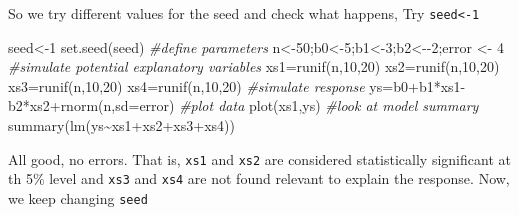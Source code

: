 \documentclass[
]{book}
\newenvironment{Shaded}{\begin{snugshade}}{\end{snugshade}}
\newcommand{\AttributeTok}[1]{\textcolor[rgb]{0.77,0.63,0.00}{#1}}
\newcommand{\CommentTok}[1]{\textcolor[rgb]{0.56,0.35,0.01}{\textit{#1}}}
\newcommand{\DecValTok}[1]{\textcolor[rgb]{0.00,0.00,0.81}{#1}}
\newcommand{\FunctionTok}[1]{\textcolor[rgb]{0.00,0.00,0.00}{#1}}
\newcommand{\NormalTok}[1]{#1}
\newcommand{\OtherTok}[1]{\textcolor[rgb]{0.56,0.35,0.01}{#1}}
\newcommand{\SpecialCharTok}[1]{\textcolor[rgb]{0.00,0.00,0.00}{#1}}
\begin{document}
So we try different values for the seed and check what happens, Try \texttt{seed\textless{}-1}

\begin{Shaded}
\begin{Highlighting}[]
\NormalTok{seed}\OtherTok{\textless{}{-}}\DecValTok{1}
\FunctionTok{set.seed}\NormalTok{(seed)}
\CommentTok{\#define parameters}
\NormalTok{n}\OtherTok{\textless{}{-}}\DecValTok{50}\NormalTok{;b0}\OtherTok{\textless{}{-}}\DecValTok{5}\NormalTok{;b1}\OtherTok{\textless{}{-}}\DecValTok{3}\NormalTok{;b2}\OtherTok{\textless{}{-}}\SpecialCharTok{{-}}\DecValTok{2}\NormalTok{;error }\OtherTok{\textless{}{-}} \DecValTok{4}
\CommentTok{\#simulate potential explanatory variables}
\NormalTok{xs1}\OtherTok{=}\FunctionTok{runif}\NormalTok{(n,}\DecValTok{10}\NormalTok{,}\DecValTok{20}\NormalTok{)}
\NormalTok{xs2}\OtherTok{=}\FunctionTok{runif}\NormalTok{(n,}\DecValTok{10}\NormalTok{,}\DecValTok{20}\NormalTok{)}
\NormalTok{xs3}\OtherTok{=}\FunctionTok{runif}\NormalTok{(n,}\DecValTok{10}\NormalTok{,}\DecValTok{20}\NormalTok{)}
\NormalTok{xs4}\OtherTok{=}\FunctionTok{runif}\NormalTok{(n,}\DecValTok{10}\NormalTok{,}\DecValTok{20}\NormalTok{)}
\CommentTok{\#simulate response}
\NormalTok{ys}\OtherTok{=}\NormalTok{b0}\SpecialCharTok{+}\NormalTok{b1}\SpecialCharTok{*}\NormalTok{xs1}\SpecialCharTok{{-}}\NormalTok{b2}\SpecialCharTok{*}\NormalTok{xs2}\SpecialCharTok{+}\FunctionTok{rnorm}\NormalTok{(n,}\AttributeTok{sd=}\NormalTok{error)}
\CommentTok{\#plot data}
\FunctionTok{plot}\NormalTok{(xs1,ys)}
\CommentTok{\#look at model summary}
\FunctionTok{summary}\NormalTok{(}\FunctionTok{lm}\NormalTok{(ys}\SpecialCharTok{\textasciitilde{}}\NormalTok{xs1}\SpecialCharTok{+}\NormalTok{xs2}\SpecialCharTok{+}\NormalTok{xs3}\SpecialCharTok{+}\NormalTok{xs4))}
\end{Highlighting}
\end{Shaded}

All good, no errors. That is, \texttt{xs1} and \texttt{xs2} are considered statistically significant at th 5\% level and \texttt{xs3} and \texttt{xs4} are not found relevant to explain the response. Now, we keep changing \texttt{seed}
\end{document}

